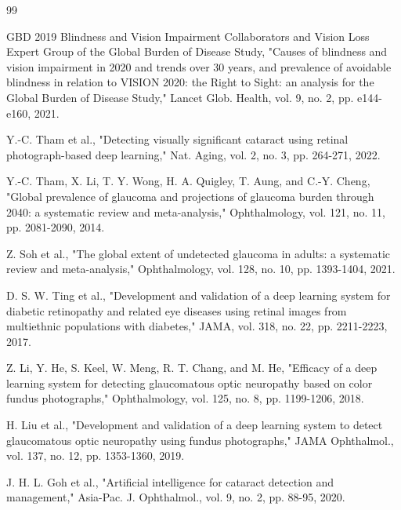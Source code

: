 \documentclass[conference,a4paper]{IEEEtran}
\begin{document}
\begin{thebibliography}{99}


GBD 2019 Blindness and Vision Impairment Collaborators and Vision Loss Expert Group of the Global
Burden of Disease Study, "Causes of blindness and vision impairment in 2020 and trends over 30
years, and prevalence of avoidable blindness in relation to VISION 2020: the Right to Sight: an
analysis for the Global Burden of Disease Study," Lancet Glob. Health, vol. 9, no. 2, pp. e144-e160,
2021.


Y.-C. Tham et al., "Detecting visually significant cataract using retinal photograph-based deep
learning," Nat. Aging, vol. 2, no. 3, pp. 264-271, 2022.


Y.-C. Tham, X. Li, T. Y. Wong, H. A. Quigley, T. Aung, and C.-Y. Cheng, "Global prevalence of
glaucoma and projections of glaucoma burden through 2040: a systematic review and meta-analysis,"
Ophthalmology, vol. 121, no. 11, pp. 2081-2090, 2014.


Z. Soh et al., "The global extent of undetected glaucoma in adults: a systematic review and
meta-analysis," Ophthalmology, vol. 128, no. 10, pp. 1393-1404, 2021.


D. S. W. Ting et al., "Development and validation of a deep learning system for diabetic retinopathy
and related eye diseases using retinal images from multiethnic populations with diabetes," JAMA,
vol. 318, no. 22, pp. 2211-2223, 2017.


Z. Li, Y. He, S. Keel, W. Meng, R. T. Chang, and M. He, "Efficacy of a deep learning system for
detecting glaucomatous optic neuropathy based on color fundus photographs," Ophthalmology, vol. 125,
no. 8, pp. 1199-1206, 2018.


H. Liu et al., "Development and validation of a deep learning system to detect glaucomatous optic
neuropathy using fundus photographs," JAMA Ophthalmol., vol. 137, no. 12, pp. 1353-1360, 2019.


J. H. L. Goh et al., "Artificial intelligence for cataract detection and management," Asia-Pac. J.
Ophthalmol., vol. 9, no. 2, pp. 88-95, 2020.


\end{thebibliography}
\end{document}
